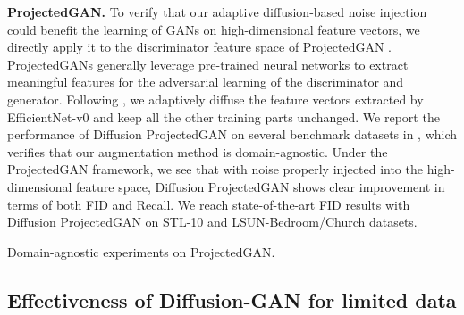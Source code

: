 \documentclass{article} \usepackage{iclr2023_conference,times}
\theoremstyle{plain}
\theoremstyle{definition}
\theoremstyle{remark}
\begin{document}
\textbf{ProjectedGAN. } To verify that our adaptive diffusion-based noise injection could benefit the learning of GANs on high-dimensional feature vectors, we directly apply it to the discriminator feature space of ProjectedGAN \citep{sauer2021projected}. ProjectedGANs generally leverage pre-trained neural networks to extract meaningful features for the adversarial learning of the discriminator and generator. 
Following \citet{sauer2021projected}, we adaptively diffuse the feature vectors extracted by EfficientNet-v0 and keep all the other training parts unchanged. We report the performance of Diffusion ProjectedGAN on several benchmark datasets in , which verifies that our augmentation method is domain-agnostic. Under the ProjectedGAN framework, we see that with noise properly injected into the high-dimensional feature space, Diffusion ProjectedGAN shows clear improvement in terms of both FID and Recall. 
We reach state-of-the-art FID results with Diffusion ProjectedGAN on STL-10 and LSUN-Bedroom/Church datasets.


\begin{table}[ht]
    \caption{Domain-agnostic experiments on ProjectedGAN. }
    \vspace{-2mm}
    \label{tab:projected_gan}
    \centering
\end{table}

\subsection{Effectiveness of Diffusion-GAN for limited data}
\end{document}
